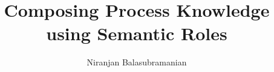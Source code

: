 \documentclass[11pt,onecolumn]{article}
\begin{document}

\title{Composing Process Knowledge using Semantic Roles}
\author{Niranjan Balasubramanian}
\maketitle
\newpage
\thispagestyle{empty}
\newpage
\tableofcontents    %
\thispagestyle{empty}
\setcounter{section}{0}
\setcounter{page}{0}
\newpage
%
\setcounter{page}{1}

\newpage

\newpage




{\small


}
\end{document}
